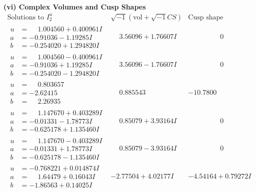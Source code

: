 \documentclass[1p]{elsarticle_modified}
\theoremstyle{definition}
\newcommand{\I}{\sqrt{-1}}
\begin{document}
\newpage\flushleft \textbf{(vi) Complex Volumes and Cusp Shapes}
$$\begin{array}{c|c|c}  
\text{Solutions to }I^u_{2}& \I (\text{vol} + \sqrt{-1}CS) & \text{Cusp shape}\\
 \hline 
\begin{aligned}
u &= \phantom{-}1.004560 + 0.400961 I \\
a &= -0.91036 - 1.19285 I \\
b &= -0.254020 + 1.294820 I\end{aligned}
 & \phantom{-}3.56096 + 1.76607 I & \phantom{-0.000000 } 0 \\ \hline\begin{aligned}
u &= \phantom{-}1.004560 - 0.400961 I \\
a &= -0.91036 + 1.19285 I \\
b &= -0.254020 - 1.294820 I\end{aligned}
 & \phantom{-}3.56096 - 1.76607 I & \phantom{-0.000000 } 0 \\ \hline\begin{aligned}
u &= \phantom{-}0.803657\phantom{ +0.000000I} \\
a &= -2.62415\phantom{ +0.000000I} \\
b &= \phantom{-}2.26935\phantom{ +0.000000I}\end{aligned}
 & \phantom{-}0.885543\phantom{ +0.000000I} & -10.7800\phantom{ +0.000000I} \\ \hline\begin{aligned}
u &= \phantom{-}1.147670 + 0.403289 I \\
a &= -0.01331 - 1.78773 I \\
b &= -0.625178 + 1.135460 I\end{aligned}
 & \phantom{-}0.85079 + 3.93164 I & \phantom{-0.000000 } 0 \\ \hline\begin{aligned}
u &= \phantom{-}1.147670 - 0.403289 I \\
a &= -0.01331 + 1.78773 I \\
b &= -0.625178 - 1.135460 I\end{aligned}
 & \phantom{-}0.85079 - 3.93164 I & \phantom{-0.000000 } 0 \\ \hline\begin{aligned}
u &= -0.768221 + 0.014874 I \\
a &= \phantom{-}1.64479 + 0.16043 I \\
b &= -1.86563 + 0.14025 I\end{aligned}
 & -2.77504 + 4.02177 I & -4.54164 + 0.79272 I \\ \hline\begin{aligned}

\end{aligned}
\end{array}$$
\end{document}
